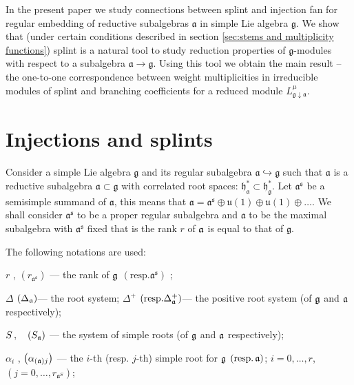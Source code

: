 \documentclass[12pt]{article}
\begin{document}
In the present paper we study connections between splint and
injection fan for regular embedding of reductive subalgebras
${\mathfrak a}$ in simple Lie algebra $\mathfrak{g}$. We show that (under
certain conditions described in section \ref{sec:stems and
multiplicity functions}) splint is a natural tool to study
reduction properties of ${\mathfrak g}$-modules
with respect to a subalgebra ${\mathfrak a}\longrightarrow
{\mathfrak g}$. Using this tool we obtain the main result -- the one-to-one correspondence between weight
multiplicities in irreducible modules of splint and branching
coefficients for a reduced module $L^{\mu}_{{\mathfrak
g}\downarrow {\mathfrak a}}$.


\section{Injections and splints}

\label{sec:Injections and splints}

Consider a simple Lie algebra $\mathfrak{g}$ and its regular subalgebra $%
\mathfrak{a}\hookrightarrow \mathfrak{g}$ such that $\mathfrak{a}$
is a
reductive subalgebra $\mathfrak{a \subset g}$ with correlated root spaces: $%
\mathfrak{h}_{\mathfrak{a}}^{\ast }\subset \mathfrak{h}_{\mathfrak{g }%
}^{\ast }$. Let $\mathfrak{a}^{\mathfrak{s}}$ be a semisimple summand of
$\mathfrak{a}$,
this means that $\mathfrak{a}=\mathfrak{a}^{\mathfrak{s}} \oplus \mathfrak{u}(1)\oplus %
\mathfrak{u}(1)\oplus \dots$. We shall consider $\mathfrak{a}^{\mathfrak{s}}$
to be a proper regular subalgebra and $\mathfrak{a}$ to be the
maximal subalgebra with $\mathfrak{a}^{\mathfrak{s}}$ fixed that is the rank
$r$ of $\frak{a}$ is equal to that of $\mathfrak{g}$.

The following notations are used:

$r$ , $\left( r_{\mathfrak{a}^{\mathfrak{s}}}\right) $ --- the rank of
$\frak{g}$ $\left( \mathrm{{resp. }\mathfrak{a}^{\mathfrak{s}}}\right) $ ;

$\Delta $ $\left( \Delta _{\frak{a}}\right) $--- the root system;
$\Delta ^{+} $ $\left( \mathrm{{resp. }\Delta
_{\frak{a}}^{+}}\right) $--- the positive root system (of
$\frak{g}$ and $\frak{a}$ respectively);

$S \, ,\quad \left( S_{\frak{a}}\right) $ --- the system of simple roots (of $%
\frak{g}$ and $\frak{a}$ respectively);

$\alpha _{i}$ , $\left( \alpha _{\left( \frak{a}\right) j}\right) $ --- the $%
i$-th (resp. $j$-th) simple root for $\frak{g}$  $\left( \mathrm{{resp. \,} \frak{%
a}}\right) $; $i=0,\ldots ,r$,\ \ $\left( j=0,\ldots ,r_{\mathfrak{a}%
^S}\right) $;
\end{document}
